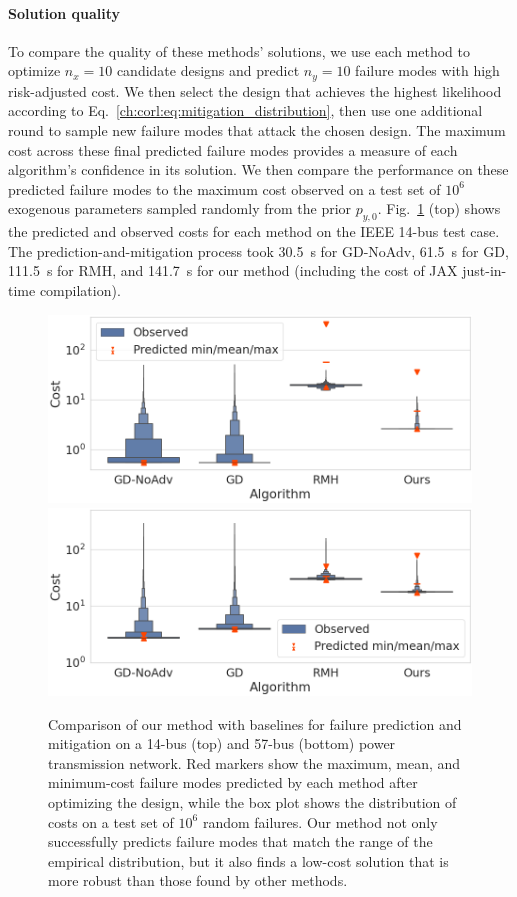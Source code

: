 {\paragraph{Solution quality} To compare the quality of these methods' solutions, we use each method to optimize $n_x = 10$ candidate designs and predict $n_y=10$ failure modes with high risk-adjusted cost. We then select the design that achieves the highest likelihood according to Eq.~\eqref{ch:corl:eq:mitigation_distribution}, then use one additional round to sample new failure modes that attack the chosen design. The maximum cost across these final predicted failure modes provides a measure of each algorithm's confidence in its solution. We then compare the performance on these predicted failure modes to the maximum cost observed on a test set of $10^6$ exogenous parameters sampled randomly from the prior $p_{y, 0}$. Fig.~\ref{ch:corl:fig:14_bus_comparison} (top) shows the predicted and observed costs for each method on the IEEE 14-bus test case. The prediction-and-mitigation process took \SI{30.5}{s} for GD-NoAdv, \SI{61.5}{s} for GD, \SI{111.5}{s} for RMH, and \SI{141.7}{s} for our method (including the cost of JAX just-in-time compilation).

\begin{figure}[tb]
    \centering
    \includegraphics[width=0.45\linewidth]{images/global_methods/14_bus_comparison.png}
    \includegraphics[width=0.45\linewidth]{images/global_methods/57_bus_comparison.png}
    \caption{Comparison of our method with baselines for failure prediction and mitigation on a 14-bus (top) and 57-bus (bottom) power transmission network. Red markers show the maximum, mean, and minimum-cost failure modes predicted by each method after optimizing the design, while the box plot shows the distribution of costs on a test set of $10^6$ random failures. Our method not only successfully predicts failure modes that match the range of the empirical distribution, but it also finds a low-cost solution that is more robust than those found by other methods.}
    \label{ch:corl:fig:14_bus_comparison}
\end{figure}

}
